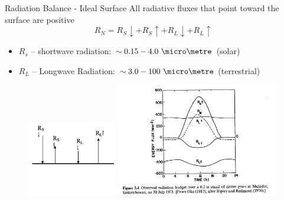 \begin{frame}{Radiation Balance - Ideal Surface}
All radiative fluxes that point toward the surface are positive
$$R_N = R_S \downarrow + R_S \uparrow + R_L \downarrow + R_L \uparrow$$
\begin{itemize}
	\item $R_s$ – shortwave radiation: $\sim 0.15-4.0\ \micro\metre$ (solar)
	\item $R_L$ – Longwave Radiation: $\sim 3.0-100\ \micro\metre$ (terrestrial)

\end{itemize}
\begin{figure}
	\includegraphics[width=0.35\textwidth]{rad4.png}
	\includegraphics[width=0.63\textwidth]{rad5.png}
\end{figure}
\end{frame}

